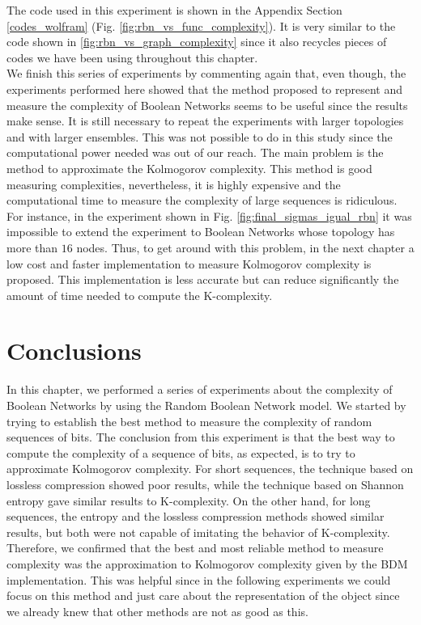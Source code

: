 The code used in this experiment is shown in the Appendix Section \ref{codes_wolfram} (Fig. \ref{fig:rbn_vs_func_complexity}). It is very similar to the code shown in \ref{fig:rbn_vs_graph_complexity} since it also recycles pieces of codes we have been using throughout this chapter.\\

We finish this series of experiments by commenting again that, even though, the experiments performed here showed that the method proposed to represent and measure the complexity of Boolean Networks seems to be useful since the results make sense. It is still necessary to repeat the experiments with larger topologies and with larger ensembles. This was not possible to do in this study since the computational power needed was out of our reach. The main problem is the method to approximate the Kolmogorov complexity. This method is good measuring complexities, nevertheless, it is highly expensive and the computational time to measure the complexity of large sequences is ridiculous. For instance, in the experiment shown in Fig. \ref{fig:final_sigmas_igual_rbn} it was impossible to extend the experiment to Boolean Networks whose topology has more than $16$ nodes. Thus, to get around with this problem, in the next chapter a low cost and faster implementation to measure Kolmogorov complexity is proposed. This implementation is less accurate but can reduce significantly the amount of time needed to compute the K-complexity.

\section{Conclusions}
In this chapter, we performed a series of experiments about the complexity of Boolean Networks by using the Random Boolean Network model. We started by trying to establish the best method to measure the complexity of random sequences of bits. The conclusion from this experiment is that the best way to compute the complexity of a sequence of bits, as expected, is to try to approximate Kolmogorov complexity. For short sequences, the technique based on lossless compression showed poor results, while the technique based on Shannon entropy gave similar results to K-complexity. On the other hand, for long sequences, the entropy and the lossless compression methods showed similar results, but both were not capable of imitating the behavior of K-complexity. 
Therefore, we confirmed that the best and most reliable method to measure complexity was the approximation to Kolmogorov complexity given by the BDM implementation. This was helpful since in the following experiments we could focus on this method and just care about the representation of the object since we already knew that other methods are not as good as this.\\

